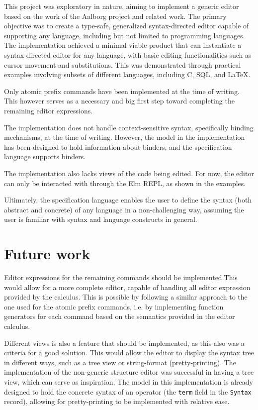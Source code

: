 This project was exploratory in nature, aiming to implement a generic editor based on the work of the Aalborg project\cite{aalborg} and related work. The primary objective was to create a type-safe, generalized syntax-directed editor capable of supporting any language, including but not limited to programming languages. The implementation achieved a minimal viable product that can instantiate a syntax-directed editor for any language, with basic editing functionalities such as cursor movement and substitutions. This was demonstrated through practical examples involving subsets of different languages, including C, SQL, and LaTeX.

Only atomic prefix commands have been implemented at the time of writing.
This however serves as a necessary and big first step toward completing the remaining editor expressions.

The implementation does not handle context-sensitive syntax, specifically
binding mechanisms, at the time of writing. However, the model in the implementation has been designed to hold information about binders, and
the specification language supports binders.

The implementation also lacks views of the code being edited. For now,
the editor can only be interacted with through the Elm REPL, as shown in the examples.

Ultimately, the specification language enables the user to define the syntax (both abstract and concrete) of any language
in a non-challenging way, assuming the user is familiar with syntax and language constructs in general.

\section{Future work}
Editor expressions for the remaining commands should be implemented.This would allow for a more complete editor, capable of handling all editor expression provided by the calculus. This is possible by following a similar approach to the one used for the atomic prefix commands, i.e. by implementing function generators for each command based on the semantics provided in the editor calculus.

Different views is also a feature that should be implemented, as this also
was a criteria for a good solution. This would allow the editor to display the syntax tree in different ways, such as a tree view or string-format (pretty-printing). The implementation of the non-generic
structure editor\cite{KU-bach} was successful in having a tree view, which can
serve as inspiration. The model in this implementation is already designed to hold the concrete syntax of an operator (the \texttt{term} field in the \texttt{Syntax} record), allowing for pretty-printing to be implemented with relative ease.

